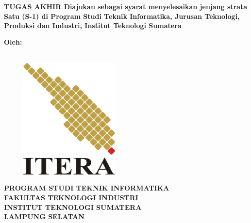 \clearpage
\pagestyle{empty}

\begin{center}
	\smallskip
	
	\begin{center}
		\fontsize{16pt}{14pt}
		\bfseries \MakeUppercase{\thetitle}
		\vfill
	    \uppercase{Tugas Akhir}
	    \vfill
		\normalfont Diajukan sebagai syarat menyelesaikan jenjang strata Satu (S-1) di Program Studi Teknik Informatika, Jurusan Teknologi, Produksi dan Industri, Institut Teknologi Sumatera
		\vfill
	\end{center}

	\large \bfseries Oleh:\\
    \large \bfseries \theauthor\\
    \printnim
    \vfill
    
    \begin{figure}[h]
    	\centering
    	\includegraphics[width=5cm, keepaspectratio]{resources/itera-logo}
    \end{figure}
    \vfill

	\begin{center}
		\fontsize{14pt}{16pt}
	    \bfseries
	    \uppercase{
	        Program Studi Teknik Informatika \\
	        Fakultas Teknologi Industri\\
	        Institut Teknologi Sumatera\\
	        Lampung Selatan
	    }\\
	    \the\year{}
    \end{center}

\end{center}

\clearpage
